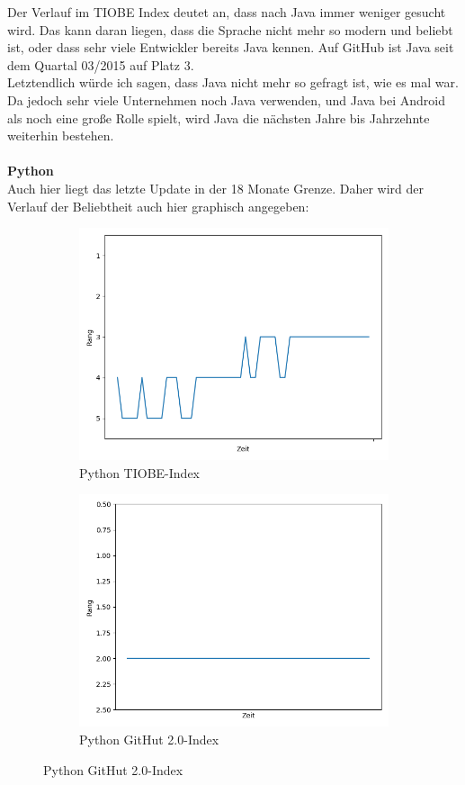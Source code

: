 \documentclass[ngerman]{article}
\begin{document}
    Der Verlauf im TIOBE Index deutet an, dass nach Java immer weniger gesucht wird. Das kann daran liegen, dass die Sprache nicht mehr so modern und beliebt ist, oder dass sehr viele Entwickler bereits Java kennen. Auf GitHub ist Java seit dem Quartal 03/2015 auf Platz 3.\\
    Letztendlich würde ich sagen, dass Java nicht mehr so gefragt ist, wie es mal war. Da jedoch sehr viele Unternehmen noch Java verwenden, und Java bei Android als noch eine große Rolle spielt, wird Java die nächsten Jahre bis Jahrzehnte weiterhin bestehen.\\\\
    \textbf{Python}\\
    Auch hier liegt das letzte Update in der 18 Monate Grenze. Daher wird der Verlauf der Beliebtheit auch hier graphisch angegeben:
    \begin{figure}[h!]
        \begin{subfigure}[h!]{.5\textwidth}
            \caption{Python TIOBE-Index}
            \centering
            \includegraphics[scale=.25]{PythonTIOBE.png}
        \end{subfigure}
        \begin{subfigure}[h!]{.5\textwidth}
            \caption{Python GitHut 2.0-Index}
            \centering
            \includegraphics[scale=.25]{PythonGitHut.png}

\end{subfigure}
\end{figure}
\end{document}
